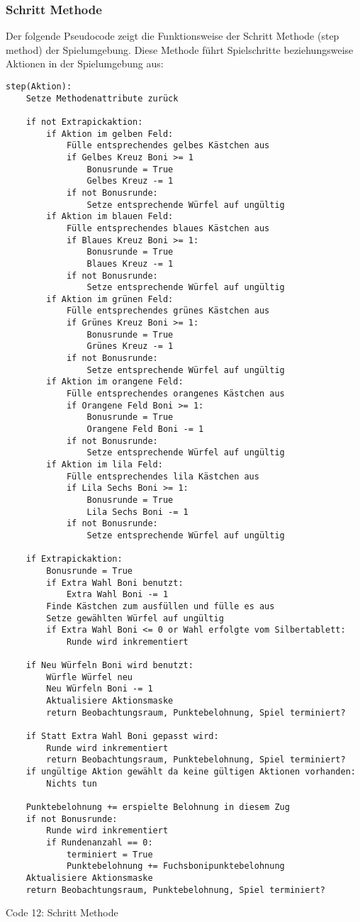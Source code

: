 \subsubsection{Schritt Methode}
Der folgende Pseudocode zeigt die Funktionsweise der Schritt Methode (step method) der Spielumgebung. Diese Methode führt Spielschritte beziehungsweise Aktionen in der Spielumgebung aus:
\vspace{0.5cm}
\begin{lstlisting}
step(Aktion):
	Setze Methodenattribute zurück
	
	if not Extrapickaktion:
		if Aktion im gelben Feld:
			Fülle entsprechendes gelbes Kästchen aus
			if Gelbes Kreuz Boni >= 1
				Bonusrunde = True
				Gelbes Kreuz -= 1
			if not Bonusrunde:
				Setze entsprechende Würfel auf ungültig
		if Aktion im blauen Feld:
			Fülle entsprechendes blaues Kästchen aus
			if Blaues Kreuz Boni >= 1:
				Bonusrunde = True
				Blaues Kreuz -= 1
			if not Bonusrunde:
				Setze entsprechende Würfel auf ungültig
		if Aktion im grünen Feld:
			Fülle entsprechendes grünes Kästchen aus
			if Grünes Kreuz Boni >= 1:
				Bonusrunde = True
				Grünes Kreuz -= 1
			if not Bonusrunde:
				Setze entsprechende Würfel auf ungültig
		if Aktion im orangene Feld:
			Fülle entsprechendes orangenes Kästchen aus
			if Orangene Feld Boni >= 1:
				Bonusrunde = True
				Orangene Feld Boni -= 1
			if not Bonusrunde:
				Setze entsprechende Würfel auf ungültig
		if Aktion im lila Feld:
			Fülle entsprechendes lila Kästchen aus
			if Lila Sechs Boni >= 1:
				Bonusrunde = True
				Lila Sechs Boni -= 1
			if not Bonusrunde:
				Setze entsprechende Würfel auf ungültig
	
	if Extrapickaktion:
		Bonusrunde = True
		if Extra Wahl Boni benutzt:
			Extra Wahl Boni -= 1
		Finde Kästchen zum ausfüllen und fülle es aus
		Setze gewählten Würfel auf ungültig
		if Extra Wahl Boni <= 0 or Wahl erfolgte vom Silbertablett:
			Runde wird inkrementiert
			
	if Neu Würfeln Boni wird benutzt:
		Würfle Würfel neu
		Neu Würfeln Boni -= 1
		Aktualisiere Aktionsmaske
		return Beobachtungsraum, Punktebelohnung, Spiel terminiert?
		
	if Statt Extra Wahl Boni gepasst wird:
		Runde wird inkrementiert
		return Beobachtungsraum, Punktebelohnung, Spiel terminiert?
	if ungültige Aktion gewählt da keine gültigen Aktionen vorhanden:
		Nichts tun
			
	Punktebelohnung += erspielte Belohnung in diesem Zug
	if not Bonusrunde:
		Runde wird inkrementiert
		if Rundenanzahl == 0:
			terminiert = True
			Punktebelohnung += Fuchsbonipunktebelohnung
	Aktualisiere Aktionsmaske
	return Beobachtungsraum, Punktebelohnung, Spiel terminiert?		
\end{lstlisting}
Code 12: Schritt Methode\\

